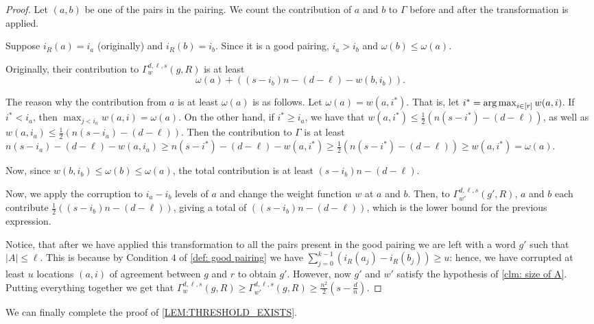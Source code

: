 \documentclass{theoretics}
\def\argmax{\operatornamewithlimits{arg\,max}}
\begin{document}
	\begin{proof}
		Let $(a, b)$ be one of the pairs in the pairing. 
		We count the contribution of $a$ and $b$ to $\Gamma$ before and after the transformation is applied.
		
		Suppose $i_R(a) = i_a$ (originally) and $i_R(b) = i_b$. Since it is a good pairing, $i_a > i_b$ and $\omega(b) \leq \omega (a)$. 
		
		Originally, their contribution to $\Gamma_w^{d, \ell, s} (g, R)$ is at least \[\omega(a) + ((s-i_b)n - (d - \ell) - w(b, i_b)).\]
		
		The reason why the contribution from $a$ is at least $\omega(a)$ is as follows. Let $\omega(a) = w(a, i^*)$. That is, let $i^* = \argmax_{i \in [r]} {w(a, i)}$. If $i^* < i_a$, then $\max_{j<i_a} w(a, i) = \omega(a)$. On the other hand, if $i^* \geq i_a$, we have that $w(a, i^*) \leq \frac{1}{2}(n(s-i^*)-(d-\ell))$, as well as  $w(a, i_a) \leq \frac{1}{2}(n(s-i_a)-(d-\ell))$. Then the contribution to $\Gamma$ is at least $ n(s-i_a)-(d-\ell) - w(a, i_a) \geq n(s-i^*)-(d-\ell) - w(a, i^*) \geq \frac{1}{2}( n(s-i^*)-(d-\ell)) \geq w(a, i^*) = \omega(a)$.
		
		Now, since $w(b, i_b) \leq \omega(b) \leq \omega(a)$, the total contribution is at least $(s-i_b)n - (d - \ell)$.
		
		Now, we apply the corruption to $i_a - i_b$ levels of $a$ and change the weight function $w$ at $a$ and $b$.
		Then, to $\Gamma_{w'}^{d, \ell, s} (g', R)$, $a$ and $b$ each contribute $\frac{1}{2}((s-i_b)n - (d-\ell))$, giving a total of $((s-i_b)n - (d-\ell))$, which is the lower bound for the previous expression.
		
		Notice, that after we have applied this transformation to all the pairs present in the good pairing we are left with a word $g'$ such that $|A|\leq \ell$. This is because by Condition $4$ of \cref{def: good pairing} we have $\sum_{j=0}^{k-1} (i_R(a_j) - i_R(b_j)) \geq u$: hence, we have corrupted at least $u$ locations $(a,i)$ of agreement between $g$ and $r$ to obtain $g'$. However, now $g'$ and $w'$ satisfy the hypothesis of \autoref{clm: size of A}.
		Putting everything together we get that  $\Gamma_w^{d, \ell, s}(g, R) \geq \Gamma_{w'}^{d, \ell, s}(g, R)\geq \frac{n^2}{2}(s-\frac{d}{n})$.    
	\end{proof}
	
	We can finally complete the proof of \cref{LEM:THRESHOLD_EXISTS}.
	
\end{document}
